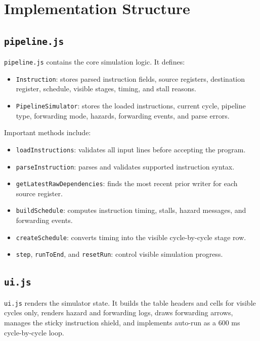 \documentclass[11pt,a4paper]{article}
\begin{document}
\section{Implementation Structure}

\subsection{\texttt{pipeline.js}}

\texttt{pipeline.js} contains the core simulation logic. It defines:

\begin{itemize}[leftmargin=*]
    \item \texttt{Instruction}: stores parsed instruction fields, source registers, destination register, schedule, visible stages, timing, and stall reasons.
    \item \texttt{PipelineSimulator}: stores the loaded instructions, current cycle, pipeline type, forwarding mode, hazards, forwarding events, and parse errors.
\end{itemize}

Important methods include:

\begin{itemize}[leftmargin=*]
    \item \texttt{loadInstructions}: validates all input lines before accepting the program.
    \item \texttt{parseInstruction}: parses and validates supported instruction syntax.
    \item \texttt{getLatestRawDependencies}: finds the most recent prior writer for each source register.
    \item \texttt{buildSchedule}: computes instruction timing, stalls, hazard messages, and forwarding events.
    \item \texttt{createSchedule}: converts timing into the visible cycle-by-cycle stage row.
    \item \texttt{step}, \texttt{runToEnd}, and \texttt{resetRun}: control visible simulation progress.
\end{itemize}

\subsection{\texttt{ui.js}}

\texttt{ui.js} renders the simulator state. It builds the table headers and cells for visible cycles only, renders hazard and forwarding logs, draws forwarding arrows, manages the sticky instruction shield, and implements auto-run as a 600 ms cycle-by-cycle loop.
\end{document}
